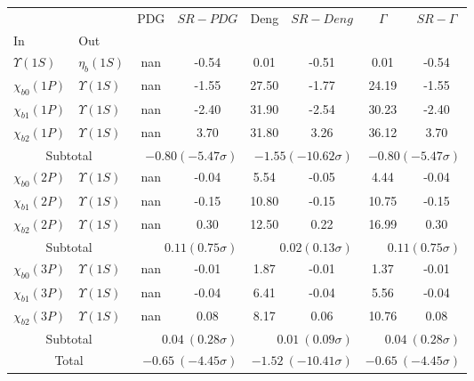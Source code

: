 \begin{tabular}{|l|l|c|c|c|c|c|c|}%
\hline%
&&PDG&$SR-PDG$&Deng&$SR-Deng$&$\Gamma$&$SR-\Gamma$\\%
In&Out&&&&&&\\%
\hline%
$\Upsilon(1S)$&$\eta_{b}(1S)$&nan&-0.54&0.01&-0.51&0.01&-0.54\\%
$\chi_{b0}(1P)$&$\Upsilon(1S)$&nan&-1.55&27.50&-1.77&24.19&-1.55\\%
$\chi_{b1}(1P)$&$\Upsilon(1S)$&nan&-2.40&31.90&-2.54&30.23&-2.40\\%
$\chi_{b2}(1P)$&$\Upsilon(1S)$&nan&3.70&31.80&3.26&36.12&3.70\\%
\hline%
\hline%
\multicolumn{2}{|c|}{Subtotal}&\multicolumn{2}{|r|}{$-0.80 (-5.47\sigma)$}&\multicolumn{2}{|r|}{$-1.55 (-10.62\sigma)$}&\multicolumn{2}{|r|}{$-0.80 (-5.47\sigma)$}\\%
\hline%
\hline%
$\chi_{b0}(2P)$&$\Upsilon(1S)$&nan&-0.04&5.54&-0.05&4.44&-0.04\\%
$\chi_{b1}(2P)$&$\Upsilon(1S)$&nan&-0.15&10.80&-0.15&10.75&-0.15\\%
$\chi_{b2}(2P)$&$\Upsilon(1S)$&nan&0.30&12.50&0.22&16.99&0.30\\%
\hline%
\hline%
\multicolumn{2}{|c|}{Subtotal}&\multicolumn{2}{|r|}{$0.11 (0.75\sigma)$}&\multicolumn{2}{|r|}{$0.02 (0.13\sigma)$}&\multicolumn{2}{|r|}{$0.11 (0.75\sigma)$}\\%
\hline%
\hline%
$\chi_{b0}(3P)$&$\Upsilon(1S)$&nan&-0.01&1.87&-0.01&1.37&-0.01\\%
$\chi_{b1}(3P)$&$\Upsilon(1S)$&nan&-0.04&6.41&-0.04&5.56&-0.04\\%
$\chi_{b2}(3P)$&$\Upsilon(1S)$&nan&0.08&8.17&0.06&10.76&0.08\\%
\hline%
\hline%
\multicolumn{2}{|c|}{Subtotal}&\multicolumn{2}{|r|}{$0.04~(0.28\sigma)$}&\multicolumn{2}{|r|}{$0.01~(0.09\sigma)$}&\multicolumn{2}{|r|}{$0.04~(0.28\sigma)$}\\%
\hline%
\hline%
\multicolumn{2}{|c|}{Total}&\multicolumn{2}{|r|}{$-0.65~(-4.45\sigma)$}&\multicolumn{2}{|r|}{$-1.52~(-10.41\sigma)$}&\multicolumn{2}{|r|}{$-0.65~(-4.45\sigma)$}\\%
\hline%
\end{tabular}